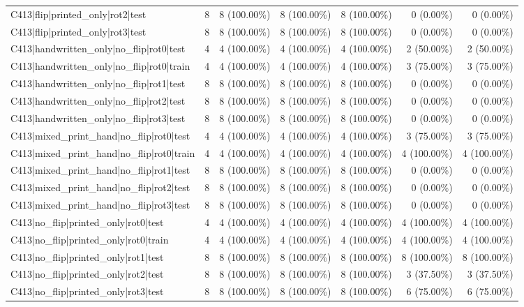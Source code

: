 \begin{longtable}{>{\raggedright\arraybackslash}p{5cm}rrrrrr}
C413|flip|printed\_only|rot2|test & 8 & 8 (100.00\%) & 8 (100.00\%) & 8 (100.00\%) & 0 (0.00\%) & 0 (0.00\%) \\
C413|flip|printed\_only|rot3|test & 8 & 8 (100.00\%) & 8 (100.00\%) & 8 (100.00\%) & 0 (0.00\%) & 0 (0.00\%) \\
C413|handwritten\_only|no\_flip|rot0|test & 4 & 4 (100.00\%) & 4 (100.00\%) & 4 (100.00\%) & 2 (50.00\%) & 2 (50.00\%) \\
C413|handwritten\_only|no\_flip|rot0|train & 4 & 4 (100.00\%) & 4 (100.00\%) & 4 (100.00\%) & 3 (75.00\%) & 3 (75.00\%) \\
C413|handwritten\_only|no\_flip|rot1|test & 8 & 8 (100.00\%) & 8 (100.00\%) & 8 (100.00\%) & 0 (0.00\%) & 0 (0.00\%) \\
C413|handwritten\_only|no\_flip|rot2|test & 8 & 8 (100.00\%) & 8 (100.00\%) & 8 (100.00\%) & 0 (0.00\%) & 0 (0.00\%) \\
C413|handwritten\_only|no\_flip|rot3|test & 8 & 8 (100.00\%) & 8 (100.00\%) & 8 (100.00\%) & 0 (0.00\%) & 0 (0.00\%) \\
C413|mixed\_print\_hand|no\_flip|rot0|test & 4 & 4 (100.00\%) & 4 (100.00\%) & 4 (100.00\%) & 3 (75.00\%) & 3 (75.00\%) \\
C413|mixed\_print\_hand|no\_flip|rot0|train & 4 & 4 (100.00\%) & 4 (100.00\%) & 4 (100.00\%) & 4 (100.00\%) & 4 (100.00\%) \\
C413|mixed\_print\_hand|no\_flip|rot1|test & 8 & 8 (100.00\%) & 8 (100.00\%) & 8 (100.00\%) & 0 (0.00\%) & 0 (0.00\%) \\
C413|mixed\_print\_hand|no\_flip|rot2|test & 8 & 8 (100.00\%) & 8 (100.00\%) & 8 (100.00\%) & 0 (0.00\%) & 0 (0.00\%) \\
C413|mixed\_print\_hand|no\_flip|rot3|test & 8 & 8 (100.00\%) & 8 (100.00\%) & 8 (100.00\%) & 0 (0.00\%) & 0 (0.00\%) \\
C413|no\_flip|printed\_only|rot0|test & 4 & 4 (100.00\%) & 4 (100.00\%) & 4 (100.00\%) & 4 (100.00\%) & 4 (100.00\%) \\
C413|no\_flip|printed\_only|rot0|train & 4 & 4 (100.00\%) & 4 (100.00\%) & 4 (100.00\%) & 4 (100.00\%) & 4 (100.00\%) \\
C413|no\_flip|printed\_only|rot1|test & 8 & 8 (100.00\%) & 8 (100.00\%) & 8 (100.00\%) & 8 (100.00\%) & 8 (100.00\%) \\
C413|no\_flip|printed\_only|rot2|test & 8 & 8 (100.00\%) & 8 (100.00\%) & 8 (100.00\%) & 3 (37.50\%) & 3 (37.50\%) \\
C413|no\_flip|printed\_only|rot3|test & 8 & 8 (100.00\%) & 8 (100.00\%) & 8 (100.00\%) & 6 (75.00\%) & 6 (75.00\%) \\

\end{longtable}
